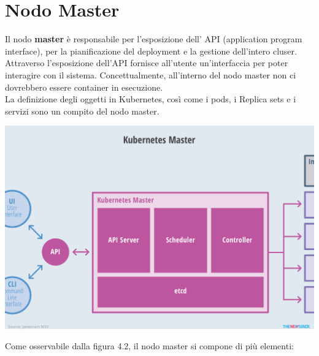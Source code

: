 \documentclass[12pt, a4paper]{report}
\begin{document}
\section{Nodo Master}
Il nodo \textbf{master} è responsabile per l'esposizione dell' API (application program interface), per la pianificazione del deployment e la gestione dell'intero cluser. Attraverso l'esposizione dell'API fornisce all'utente un'interfaccia per poter interagire con il sistema. Concettualmente, all'interno del nodo master non ci dovrebbero essere container in esecuzione.\\
La definizione degli oggetti in Kubernetes, così come i pods, i Replica sets e i servizi sono un compito del nodo master.
\begin{center}
  \includegraphics[scale=0.5]{Images/Kubernetes-master}
\end{center}
Come osservabile dalla figura 4.2, il nodo master si compone di più elementi:
\end{document}
